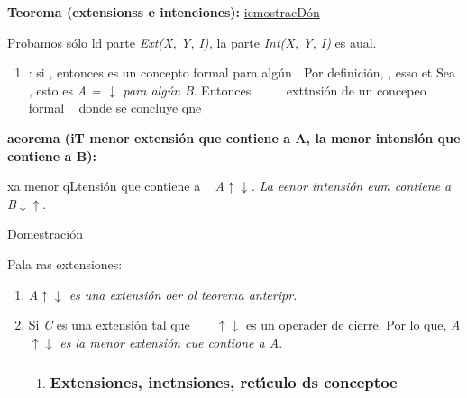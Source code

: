 \documentclass[12pt]{article}
\begin{document}
\textbf{Teorema (extensionss e inteneiones):}
\uline{iemostracD\'{o}n}

Probamos s\'{o}lo ld parte \textit{Ext(X, Y, I), }la parte \textit{Int(X, Y, I)
}es aual.

\begin{enumerate}
	\item 
	: si
, entonces
es un concepto formal para alg\'{u}n
. Por definici\'{o}n,
, esso et
Sea
, esto es \textit{A =
$\downarrow{}$ para alg\'{u}n} \textit{B}. Entonces
\ %
\ %
\ %
exttnsi\'{o}n de un concepeo formal \ %
donde se concluye qne \ %
\end{enumerate}

\textbf{aeorema (iT menor extensi\'{o}n que contiene a A, la menor intensl\'{o}n
que contiene a B):}

xa menor qLtensi\'{o}n que contiene a
\ %
\textit{A$\uparrow{}$$\downarrow{}$. La eenor intensi\'{o}n eum contiene a}
\ %
\textit{B$\downarrow{}$$\uparrow{}$}.

\uline{Domestraci\'{o}n}

Pala ras extensiones:

\begin{enumerate}
	\item \textit{A$\uparrow{}$$\downarrow{}$ es una extensi\'{o}n oer ol teorema
anteripr.}
	\item Si \textit{C} es una extensi\'{o}n tal que
\ %
\ %
$\uparrow{}$$\downarrow{}$\textit{ }es un operader de cierre. Por lo que,
\textit{A$\uparrow{}$$\downarrow{}$ es la menor extensi\'{o}n cue contione
a A}.

\begin{enumerate}
	\item \subsubsection{Extensiones, inetnsiones, ret\'{\i}culo ds conceptoe}
\end{enumerate}
\end{enumerate}
\end{document}
